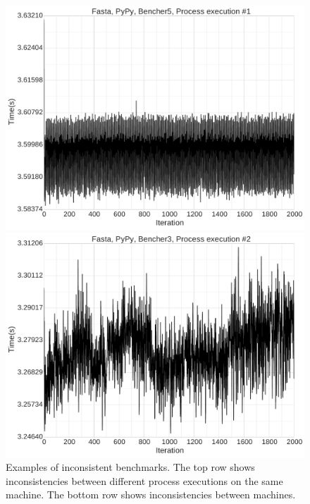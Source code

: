\documentclass[a4paper,UKenglish]{lipics}
\begin{document}
\begin{figure}[tbp]
{\begin{minipage}{.65\textwidth}
\includegraphics[width=\textwidth]{examples/inconsistent2a.pdf}
\end{minipage}
\begin{minipage}{.65\textwidth}
\includegraphics[width=\textwidth]{examples/inconsistent2b.pdf}
\end{minipage}
}
\caption{Examples of inconsistent benchmarks.
The top row shows inconsistencies between different process
executions on the same machine. The bottom row shows inconsistencies between
machines.}
\label{fig:examples:inconsistent}
\end{figure}
\end{document}
